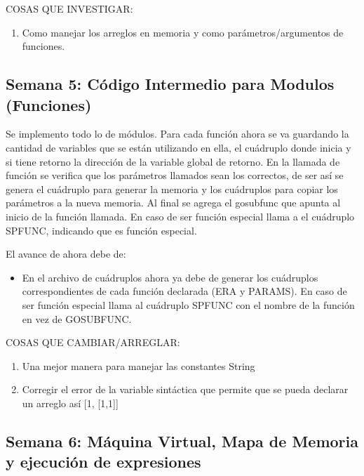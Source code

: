 COSAS QUE INVESTIGAR:
\begin{enumerate}
    \item Como manejar los arreglos en memoria y como parámetros/argumentos de funciones.
\end{enumerate}



\subsection{Semana 5: Código Intermedio para Modulos (Funciones)}

Se implemento todo lo de módulos. Para cada función ahora se va guardando la cantidad de variables que se están utilizando en ella, el cuádruplo donde inicia y si tiene retorno la dirección de la variable global de retorno. En la llamada de función se verifica que los parámetros llamados sean los correctos, de ser así se genera el cuádruplo para generar la memoria y los cuádruplos para copiar los parámetros a la nueva memoria. Al final se agrega el gosubfunc que apunta al inicio de la función llamada. En caso de ser función especial llama a el cuádruplo SPFUNC, indicando que es función especial.

El avance de ahora debe de:

\begin{itemize}
    \item En el archivo de cuádruplos ahora ya debe de generar los cuádruplos correspondientes de cada función declarada (ERA y PARAMS). En caso de ser función especial llama al cuádruplo SPFUNC con el nombre de la función en vez de GOSUBFUNC.
\end{itemize}



COSAS QUE CAMBIAR/ARREGLAR:

\begin{enumerate}
    \item Una mejor manera para manejar las constantes String
    \item Corregir el error de la variable sintáctica que permite que se pueda declarar un arreglo así [1, [1,1]]
\end{enumerate}
   



\subsection{Semana 6: Máquina Virtual, Mapa de Memoria y ejecución de expresiones}

